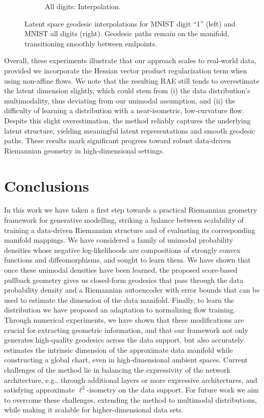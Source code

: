 \begin{figure}[htbp]
\begin{subfigure}[b]{0.45\textwidth}
            \caption{\scriptsize All digits: Interpolation.}
        \end{subfigure}
        \caption{Latent space geodesic interpolations for MNIST digit ``1'' (left) and MNIST all digits (right). Geodesic paths remain on the manifold, transitioning smoothly between endpoints.}
        \label{fig:mnist_interpolations}
    \end{figure}
    
    Overall, these experiments illustrate that our approach scales to real-world data, provided we incorporate the Hessian vector product regularization term when using non-affine flows. We note that the resulting RAE still tends to overestimate the latent dimension slightly, which could stem from (i) the data distribution’s multimodality, thus deviating from our unimodal assumption, and (ii) the difficulty of learning a distribution with a near-isometric, low-curvature flow. Despite this slight overestimation, the method reliably captures the underlying latent structure, yielding meaningful latent representations and smooth geodesic paths. These results mark significant progress toward robust data-driven Riemannian geometry in high-dimensional settings.

    
\section{Conclusions}
\label{sec:conclusions}

In this work we have taken a first step towards a practical Riemannian geometry framework for generative modelling, striking a balance between scalability of training a data-driven Riemannian structure and of evaluating its corresponding manifold mappings. We have considered a family of unimodal probability densities whose negative log-likelihoods are compositions of strongly convex functions and diffeomorphisms, and sought to learn them. We have shown that once these unimodal densities have been learned, the proposed score-based pullback geometry gives us closed-form geodesics that pass through the data probability density and a Riemannian autoencoder with error bounds that can be used to estimate the dimension of the %
data manifold. Finally, to learn the distribution we have proposed an adaptation to normalizing flow training. Through numerical experiments, we have shown that these modifications are crucial for extracting geometric information, and that our framework not only generates high-quality geodesics across the data support, but also accurately estimates the intrinsic dimension of the approximate data manifold while constructing a global chart, even in high-dimensional ambient spaces. Current challenges of the method lie in balancing the expressivity of the network architecture, e.g., through additional layers or more expressive architectures, and satisfying approximate $\ell^2$-isometry on the data support. For future work we aim to overcome these challenges, extending the method to multimodal distributions, while making it scalable for higher-dimensional data sets.
